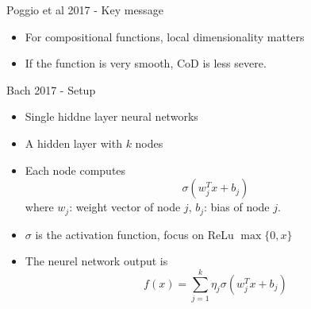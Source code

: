 \documentclass[aspectratio=169]{beamer} %
\begin{document}
\begin{frame}{Poggio et al 2017 - Key message}
\begin{itemize}
    \item For compositional functions, local dimensionality matters
    \item If the function is very smooth, CoD is less severe.
\end{itemize}
    
\end{frame}
\begin{frame}{Bach 2017 - Setup}
\begin{itemize}
    \item Single hiddne layer neural networks
    \item A hidden layer with $k$ nodes
    \item Each node computes
    $$
    \sigma(w_j^Tx+b_j)
    $$
    where $w_j$: weight vector of node $j$, $b_j$: bias of node $j$. 
    \item $\sigma$ is the activation function, focus on ReLu $\max\{0,x\}$
    \item The neurel network output is
    $$
    f(x) = \sum_{j=1}^k\eta_j \sigma(w_j^Tx+b_j)
    $$
\end{itemize}
    
\end{frame}
\end{document}
